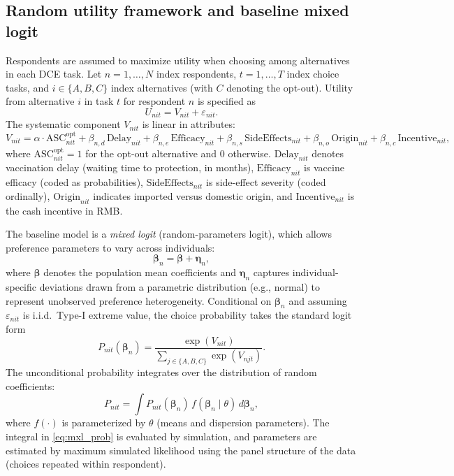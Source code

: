 \documentclass[doublespacing]{utdthesis}
\begin{document}
\subsection{Random utility framework and baseline mixed logit}
\label{subsec:ruf_mxl}

Respondents are assumed to maximize utility when choosing among alternatives in each DCE task. Let $n=1,\dots,N$ index respondents, $t=1,\dots,T$ index choice tasks, and $i \in \{A,B,C\}$ index alternatives (with $C$ denoting the opt-out). Utility from alternative $i$ in task $t$ for respondent $n$ is specified as
\begin{equation}
U_{nit} = V_{nit} + \varepsilon_{nit}.
\end{equation}
The systematic component $V_{nit}$ is linear in attributes:
\begin{equation}
V_{nit} = \alpha \cdot \text{ASC}^{\text{opt}}_{nit}
+ \beta_{n,d}\,\text{Delay}_{nit}
+ \beta_{n,e}\,\text{Efficacy}_{nit}
+ \beta_{n,s}\,\text{SideEffects}_{nit}
+ \beta_{n,o}\,\text{Origin}_{nit}
+ \beta_{n,c}\,\text{Incentive}_{nit},
\label{eq:mxl_utility}
\end{equation}
where $\text{ASC}^{\text{opt}}_{nit}=1$ for the opt-out alternative and 0 otherwise. $\text{Delay}_{nit}$ denotes vaccination delay (waiting time to protection, in months), $\text{Efficacy}_{nit}$ is vaccine efficacy (coded as probabilities), $\text{SideEffects}_{nit}$ is side-effect severity (coded ordinally), $\text{Origin}_{nit}$ indicates imported versus domestic origin, and $\text{Incentive}_{nit}$ is the cash incentive in RMB.

The baseline model is a \textit{mixed logit} (random-parameters logit), which allows preference parameters to vary across individuals:
\begin{equation}
\boldsymbol{\beta}_n = \boldsymbol{\beta} + \boldsymbol{\eta}_n,
\end{equation}
where $\boldsymbol{\beta}$ denotes the population mean coefficients and $\boldsymbol{\eta}_n$ captures individual-specific deviations drawn from a parametric distribution (e.g., normal) to represent unobserved preference heterogeneity. Conditional on $\boldsymbol{\beta}_n$ and assuming $\varepsilon_{nit}$ is i.i.d.\ Type-I extreme value, the choice probability takes the standard logit form
\begin{equation}
P_{nit}(\boldsymbol{\beta}_n)=
\frac{\exp(V_{nit})}{\sum_{j \in \{A,B,C\}} \exp(V_{njt})}.
\end{equation}
The unconditional probability integrates over the distribution of random coefficients:
\begin{equation}
P_{nit}=\int P_{nit}(\boldsymbol{\beta}_n)\, f(\boldsymbol{\beta}_n \mid \theta)\, d\boldsymbol{\beta}_n,
\label{eq:mxl_prob}
\end{equation}
where $f(\cdot)$ is parameterized by $\theta$ (means and dispersion parameters). The integral in \eqref{eq:mxl_prob} is evaluated by simulation, and parameters are estimated by maximum simulated likelihood using the panel structure of the data (choices repeated within respondent).
\end{document}
